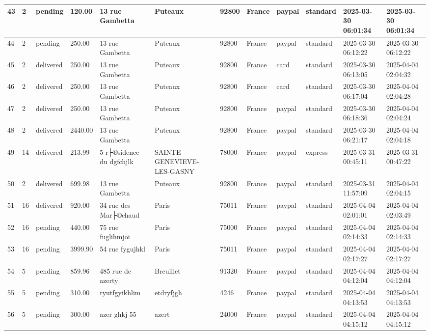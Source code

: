 \begin{longtable}{|l|l|l|l|l|l|l|l|l|l|l|l|}
43 & 2 & pending & 120.00 & 13 rue Gambetta & Puteaux & 92800 & France & paypal & standard & 2025-03-30 06:01:34 & 2025-03-30 06:01:34 \\ \hline 
44 & 2 & pending & 250.00 & 13 rue Gambetta & Puteaux & 92800 & France & paypal & standard & 2025-03-30 06:12:22 & 2025-03-30 06:12:22 \\ \hline 
45 & 2 & delivered & 250.00 & 13 rue Gambetta & Puteaux & 92800 & France & card & standard & 2025-03-30 06:13:05 & 2025-04-04 02:04:32 \\ \hline 
46 & 2 & delivered & 250.00 & 13 rue Gambetta & Puteaux & 92800 & France & card & standard & 2025-03-30 06:17:04 & 2025-04-04 02:04:28 \\ \hline 
47 & 2 & delivered & 250.00 & 13 rue Gambetta & Puteaux & 92800 & France & paypal & standard & 2025-03-30 06:18:36 & 2025-04-04 02:04:24 \\ \hline 
48 & 2 & delivered & 2440.00 & 13 rue Gambetta & Puteaux & 92800 & France & paypal & standard & 2025-03-30 06:21:17 & 2025-04-04 02:04:18 \\ \hline 
49 & 14 & delivered & 213.99 & 5 r├®sidence du dgfchjlk & SAINTE-GENEVIEVE-LES-GASNY & 78000 & France & paypal & express & 2025-03-31 00:45:11 & 2025-03-31 00:47:22 \\ \hline 
50 & 2 & delivered & 699.98 & 13 rue Gambetta & Puteaux & 92800 & France & paypal & standard & 2025-03-31 11:57:09 & 2025-04-04 02:04:15 \\ \hline 
51 & 16 & delivered & 920.00 & 34 rue des Mar├®chaud & Paris & 75011 & France & paypal & standard & 2025-04-04 02:01:01 & 2025-04-04 02:03:49 \\ \hline 
52 & 16 & pending & 440.00 & 75 rue fuglihmjoi & Paris & 75000 & France & paypal & standard & 2025-04-04 02:14:33 & 2025-04-04 02:14:33 \\ \hline 
53 & 16 & pending & 3999.90 & 54 rue fygujhkl & Paris & 75011 & France & paypal & standard & 2025-04-04 02:17:27 & 2025-04-04 02:17:27 \\ \hline 
54 & 5 & pending & 859.96 & 485 rue de azerty & Breuillet & 91320 & France & paypal & standard & 2025-04-04 04:12:04 & 2025-04-04 04:12:04 \\ \hline 
55 & 5 & pending & 310.00 & ryutfgyikhlim & etdryfjgh & 4246 & France & paypal & standard & 2025-04-04 04:13:53 & 2025-04-04 04:13:53 \\ \hline 
56 & 5 & pending & 300.00 & azer ghkj 55 & azert & 24000 & France & paypal & standard & 2025-04-04 04:15:12 & 2025-04-04 04:15:12 \\ \hline 

\end{longtable}
